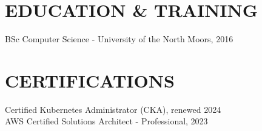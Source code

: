 \documentclass[11pt,a4paper]{article}
\begin{document}
\section*{EDUCATION \& TRAINING}
BSc Computer Science - University of the North Moors, 2016

\section*{CERTIFICATIONS}
Certified Kubernetes Administrator (CKA), renewed 2024\\
AWS Certified Solutions Architect - Professional, 2023
\end{document}
